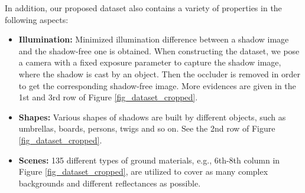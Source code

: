 \documentclass[10pt,twocolumn,letterpaper]{article}
\begin{document}
In addition, our proposed dataset also contains a variety of properties in the following aspects:
\begin{itemize}
	
	\item \textbf{Illumination:} {Minimized illumination difference} between a shadow image and the shadow-free one is obtained. When constructing the dataset, we pose a camera with a fixed exposure parameter to capture the shadow image, where the shadow is cast by an object. Then the occluder is removed in order to get the corresponding shadow-free image. More evidences are given in the 1st and 3rd row of Figure \ref{fig_dataset_cropped}. 
	
	\item \textbf{Shapes:}  {Various shapes} of shadows are built by different objects, such as umbrellas, boards, persons, twigs and so on. See the 2nd row of Figure \ref{fig_dataset_cropped}.
	


	\item \textbf{Scenes:} 135 different types of ground materials, e.g., 6th-8th column in Figure \ref{fig_dataset_cropped}, are utilized to cover as many complex backgrounds and different reflectances as possible. 
\end{itemize}
\end{document}
